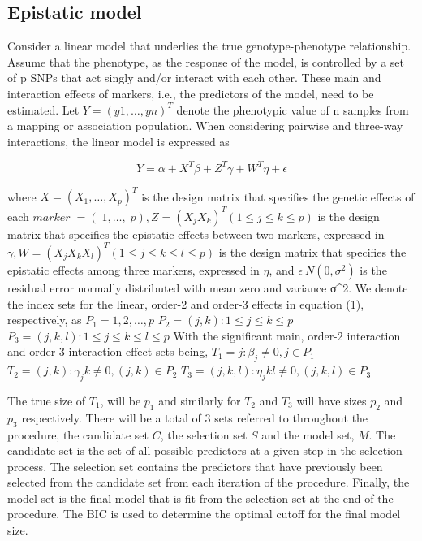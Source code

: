 \documentclass[11pt,]{book}
\theoremstyle{definition}
\theoremstyle{definition}
\theoremstyle{remark}
\begin{document}
\subsection{Epistatic model}\label{epistatic-model}

Consider a linear model that underlies the true genotype-phenotype
relationship. Assume that the phenotype, as the response of the model,
is controlled by a set of p SNPs that act singly and/or interact with
each other. These main and interaction effects of markers, i.e., the
predictors of the model, need to be estimated. Let \(Y = (y1, …, yn)^T\)
denote the phenotypic value of n samples from a mapping or association
population. When considering pairwise and three-way interactions, the
linear model is expressed as

\begin{equation}
Y = \alpha + X^T\beta + Z^T\gamma + W^T\eta + \epsilon
\label{eq:lin-mod}
\end{equation}

where \(X=(X_1,…,X_p )^T\) is the design matrix that specifies the
genetic effects of each
\(marker  = (1, …, p) , Z=(X_j X_k )^T (1≤j≤k≤p)\) is the design
matrix that specifies the epistatic effects between two markers,
expressed in \(γ, W=(X_j X_k X_l )^T (1≤j≤k≤l≤p)\) is the design matrix
that specifies the epistatic effects among three markers, expressed in
\(η\), and \(ϵ~N(0,σ^2 )\) is the residual error normally distributed
with mean zero and variance σ\^{}2. We denote the index sets for the
linear, order-2 and order-3 effects in equation (1), respectively, as
\(P_1={1,2,…,p}\) \(P_2={(j,k):1≤j≤k≤p}\) \(P_3={(j,k,l):1≤j≤k≤l≤p}\)
With the significant main, order-2 interaction and order-3 interaction
effect sets being, \(T_1={j:β_j≠0,j∈P_1 }\)
\(T_2={(j,k):γ_jk≠0,(j,k)∈P_2 }\) \(T_3={(j,k,l):η_jkl≠0,(j,k,l)∈P_3 }\)

The true size of \(T_1\), will be \(p_1\) and similarly for \(T_2\) and
\(T_3\) will have sizes \(p_2\) and \(p_3\) respectively. There will be
a total of 3 sets referred to throughout the procedure, the candidate
set \(C\), the selection set \(S\) and the model set, \(M\). The
candidate set is the set of all possible predictors at a given step in
the selection process. The selection set contains the predictors that
have previously been selected from the candidate set from each iteration
of the procedure. Finally, the model set is the final model that is fit
from the selection set at the end of the procedure. The BIC is used to
determine the optimal cutoff for the final model size.
\end{document}
